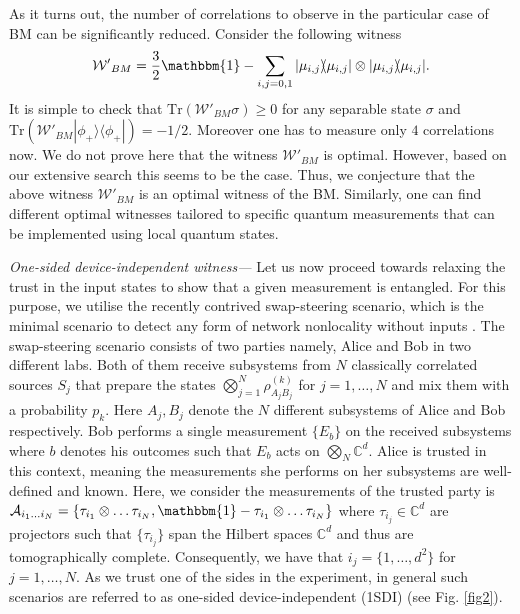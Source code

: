 \documentclass[pra,twocolumn,showpacs]{revtex4-2}
\newcommand{\Tr}[1]{\mathrm{Tr}#1}
\newcommand{\ket}[1]{|#1\rangle}
\newcommand{\bra}[1]{\langle#1|}
\newcommand{\proj}[1]{\ket{#1}\!\!\bra{#1}}
\newcommand{\I}{\mathbbm{1}}
\theoremstyle{plain}
\theoremstyle{definition}
\theoremstyle{remark}
\begin{document}
As it turns out, the number of correlations to observe in the particular case of BM can be significantly reduced. Consider the following witness 
\begin{eqnarray}
     \mathcal{W'}_{BM}=\frac{3}{2}\I-\sum_{i,j=0,1}\proj{\mu_{i,j}}\otimes\proj{\mu_{i,j}}.
\end{eqnarray}
It is simple to check that $\Tr(\mathcal{W'}_{BM}\sigma)\geq0$ for any separable state $\sigma$ and $\Tr(\mathcal{W'}_{BM}\proj{\phi_+})=-1/2$. Moreover one has to measure only $4$ correlations now. We do not prove here that the witness $\mathcal{W'}_{BM}$ is optimal. However, based on our extensive search this seems to be the case. Thus, we conjecture that the above witness $\mathcal{W'}_{BM}$ is an optimal witness of the BM. Similarly, one can find different optimal witnesses tailored to specific quantum measurements that can be implemented using local quantum states.



{\it{One-sided device-independent witness---}} Let us now proceed towards relaxing the trust in the input states to show that a given measurement is entangled. For this purpose, we utilise the recently contrived swap-steering scenario, which is the minimal scenario to detect any form of network nonlocality without inputs \cite{Sarkar2024networkquantum}. The swap-steering scenario consists of two parties namely, Alice and Bob in two different labs. Both of them receive subsystems from $N$ classically correlated sources $S_j$ that prepare the states $\bigotimes_{j=1}^N\rho_{A_jB_j}^{(k)}$ for $j=1,\ldots,N$ and mix them with a probability $p_k$. Here $A_j, B_j$ denote the $N$ different subsystems of Alice and Bob respectively. Bob performs a single measurement $\{E_b\}$ on the received subsystems where $b$ denotes his outcomes such that $E_b$ acts on $\bigotimes_N\mathbb{C}^d$. Alice is trusted in this context, meaning the measurements she performs on her subsystems are well-defined and known. Here, we consider the measurements of the trusted party is $\mathcal{A}_{i_1\ldots i_N}=\{\tau_{i_1}\otimes\ldots\tau_{i_N},\I-\tau_{i_1}\otimes\ldots\tau_{i_N}\}$ where $\tau_{i_j}\in \mathbb{C}^{d}$ are projectors such that $\{\tau_{i_j}\}$ span the Hilbert spaces $\mathbb{C}^{d}$ and thus are tomographically complete. Consequently, we have that $i_j=\{1,\ldots,d^2\}$ for $j=1,\ldots,N$. As we trust one of the sides in the experiment, in general such scenarios are referred to as one-sided device-independent (1SDI) (see Fig. \ref{fig2}). 
\end{document}
